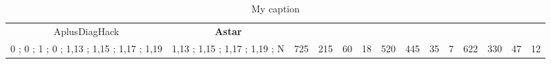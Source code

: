 \begin{table}[]
{\begin{tabular}{|c|c|c|c|c|c|c|c|c|c|c|c|c|c|}
AplusDiagHack & \cellcolor{blue!15}\textbf{Astar}& {\color[HTML]{00009B} } & {\color[HTML]{9A0000} } & {\color[HTML]{009901} } &  & {\color[HTML]{00009B} } & {\color[HTML]{9A0000} } & {\color[HTML]{009901} } &  & {\color[HTML]{00009B} } & {\color[HTML]{9A0000} } & {\color[HTML]{009901} } &  \\ 
0 ; 0 ; 1 ; 0 ; 1,13 ; 1,15 ; 1,17 ; 1,19 & \cellcolor{ blue!15}1,13 ; 1,15 ; 1,17 ; 1,19 ; N & \multirow{-2}{*}{{\color[HTML]{00009B} 725}} & \multirow{-2}{*}{{\color[HTML]{9A0000} 215}} & \multirow{-2}{*}{{\color[HTML]{009901} 60}} & \multirow{-2}{*}{18} & \multirow{-2}{*}{{\color[HTML]{00009B} 520}} & \multirow{-2}{*}{{\color[HTML]{9A0000} 445}} & \multirow{-2}{*}{{\color[HTML]{009901} 35}} & \multirow{-2}{*}{7} & \multirow{-2}{*}{{\color[HTML]{00009B} 622}} & \multirow{-2}{*}{{\color[HTML]{9A0000} 330}} & \multirow{-2}{*}{{\color[HTML]{009901} 47}} & \multirow{-2}{*}{12} \\ \hline
\end{tabular}} \caption{ My caption} \label{ my - label} \end{table}
